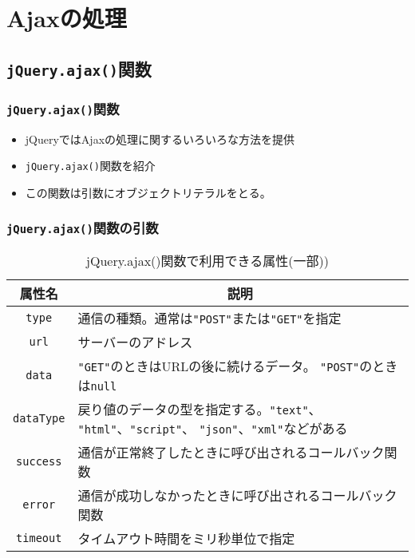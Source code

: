 \documentclass[dvipsk]{beamer}
\begin{document}
\section{Ajaxの処理}
\subsection{\texttt{jQuery.ajax()}関数}
\begin{frame}[containsverbatim]
 \frametitle{\texttt{jQuery.ajax()}関数}
 \begin{itemize}
  \item jQueryではAjaxの処理に関するいろいろな方法を提供
  \item \texttt{jQuery.ajax()}関数を紹介
  \item この関数は引数にオブジェクトリテラルをとる。
 \end{itemize}
\end{frame}
\begin{frame}[containsverbatim]
 \frametitle{\texttt{jQuery.ajax()}関数の引数}
 \begin{table}[ht]
 \caption{jQuery.ajax()関数で利用できる属性(一部))}\label{jQueryAjax}
\begin{center}
 \begin{tabular}{|c|m{}|}\hline
属性名  &\multicolumn{1}{c|}{説明} \\\hline
  \texttt{type}&通信の種類。通常は\texttt{"POST"}または\texttt{"GET"}を指定\\
  \hline
  \texttt{url}&サーバーのアドレス\\ \hline
  \texttt{data}&\texttt{"GET"}のときはURLの後に続けるデータ。
      \texttt{"POST"}のときは\texttt{null}\\ \hline
  \texttt{dataType}&戻り値のデータの型を指定する。\texttt{"text"}、
      \texttt{"html"}、\texttt{"script"}、      
\texttt{"json"}、\texttt{"xml"}などがある\\ \hline
\texttt{success}&通信が正常終了したときに呼び出されるコールバック関数
      \\ \hline
\texttt{error}&通信が成功しなかったときに呼び出されるコールバック関数
      \\ \hline
  \texttt{timeout}&タイムアウト時間をミリ秒単位で指定\\ \hline
 \end{tabular}
\end{center}
\end{table}
\end{frame}
\end{document}
